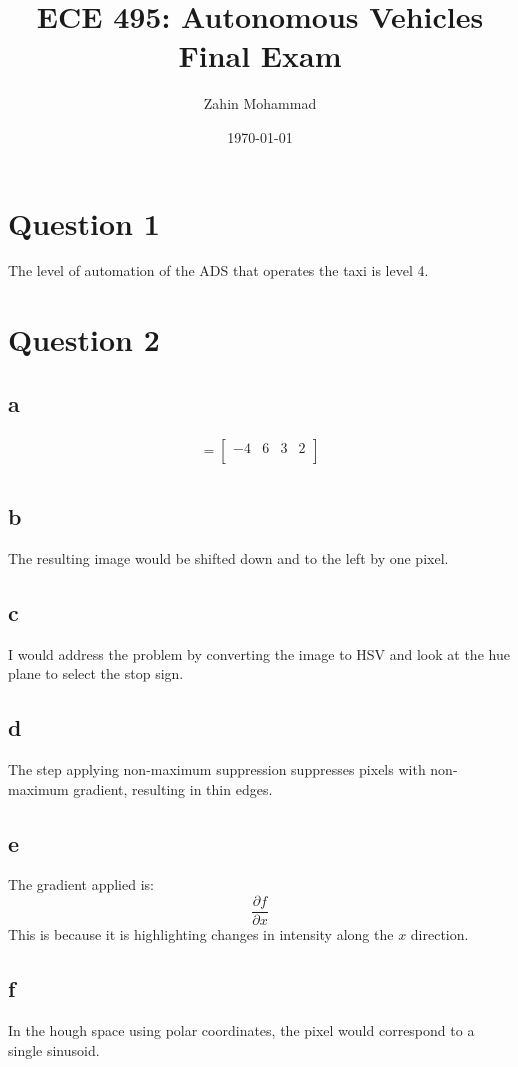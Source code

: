 \documentclass[12pt]{article}
\title{ECE 495: Autonomous Vehicles\\Final Exam}
\author{Zahin Mohammad}
\date{\today}
\begin{document}
\maketitle
\section{Question 1}
The level of automation of the ADS that operates the taxi is level 4.
\section{Question 2}
\subsection{a}
\begin{align*}
    = \begin{bmatrix}
        -4 & 6 & 3 & 2 \\
    \end{bmatrix} \\
\end{align*}
\subsection{b}
The resulting image would be shifted down and to the left by one pixel.
\subsection{c}
I would address the problem by converting the image to HSV and look at the hue plane to select the stop sign.
\subsection{d}
The step applying non-maximum suppression suppresses pixels with non-maximum gradient, resulting in thin edges.
\subsection{e}
The gradient applied is:
\begin{equation*}
    \frac{\partial{f}}{\partial{x}}
\end{equation*}
This is because it is highlighting changes in intensity along the $x$ direction.
\subsection{f}
In the hough space using polar coordinates, the pixel would correspond to a single sinusoid.
\end{document}
